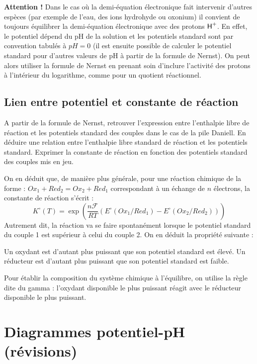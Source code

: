 \documentclass[11pt,fleqn]{book} %
\begin{document}
\textbf{Attention !} Dans le cas où la demi-équation électronique fait intervenir d'autres espèces (par exemple de l'eau, des ions hydrohyde ou oxonium) il convient de toujours équilibrer la demi-équation électronique avec des protons $\ce{H^+}$. En effet, le potentiel dépend du pH de la solution et les potentiels standard sont par convention tabulés à $pH = 0$ (il est ensuite possible de calculer le potentiel standard pour d'autres valeurs de pH à partir de la formule de Nernst). On peut alors utiliser la formule de Nernst en prenant soin d'inclure l'activité des protons à l'intérieur du logarithme, comme pour un quotient réactionnel.

\subsection{Lien entre potentiel et constante de réaction}

\begin{capex}
	A partir de la formule de Nernst, retrouver l'expression entre l'enthalpie libre de réaction et les potentiels standard des couples dans le cas de la pile Daniell. En déduire une relation entre l'enthalpie libre standard de réaction et les potentiels standard. Exprimer la constante de réaction en fonction des potentiels standard des couples mis en jeu.
\end{capex}

On en déduit que, de manière plus générale, pour une réaction chimique de la forme : $Ox_1 + Red_2 = Ox_2 + Red_1$ correspondant à un échange de $n$ électrons, la constante de réaction s'écrit :
\begin{equation}
	K^\circ(T) = \exp\left(\frac{n \mathcal{F}}{RT} (E^\circ(Ox_1/Red_1) - E^\circ(Ox_2/Red_2))\right)
\end{equation}
Autrement dit, la réaction va se faire spontanément lorsque le potentiel standard du couple 1 est supérieur à celui du couple 2. On en déduit la propriété suivante :
\begin{proposition}
	Un oxydant est d'autant plus puissant que son potentiel standard est élevé. Un réducteur est d'autant plus puissant que son potentiel standard est faible.
\end{proposition}

Pour établir la composition du système chimique à l'équilibre, on utilise la règle dite du gamma : l'oxydant disponible le plus puissant réagit avec le réducteur disponible le plus puissant.


\section{Diagrammes potentiel-pH (révisions)}
\end{document}
